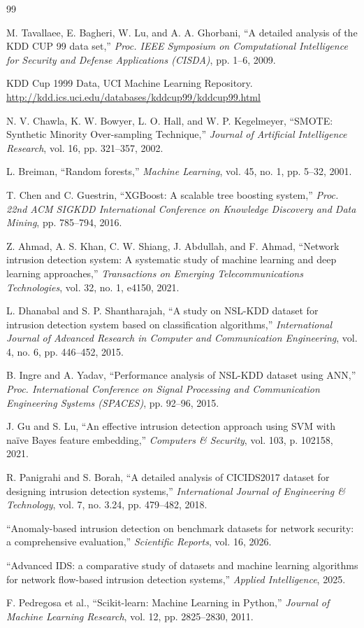\documentclass[11pt, a4paper]{article}
\begin{document}
\begin{thebibliography}{99}

M. Tavallaee, E. Bagheri, W. Lu, and A. A. Ghorbani, ``A detailed analysis of the KDD CUP 99 data set,'' \emph{Proc. IEEE Symposium on Computational Intelligence for Security and Defense Applications (CISDA)}, pp. 1--6, 2009.

KDD Cup 1999 Data, UCI Machine Learning Repository. \url{http://kdd.ics.uci.edu/databases/kddcup99/kddcup99.html}

N. V. Chawla, K. W. Bowyer, L. O. Hall, and W. P. Kegelmeyer, ``SMOTE: Synthetic Minority Over-sampling Technique,'' \emph{Journal of Artificial Intelligence Research}, vol. 16, pp. 321--357, 2002.

L. Breiman, ``Random forests,'' \emph{Machine Learning}, vol. 45, no. 1, pp. 5--32, 2001.

T. Chen and C. Guestrin, ``XGBoost: A scalable tree boosting system,'' \emph{Proc. 22nd ACM SIGKDD International Conference on Knowledge Discovery and Data Mining}, pp. 785--794, 2016.

Z. Ahmad, A. S. Khan, C. W. Shiang, J. Abdullah, and F. Ahmad, ``Network intrusion detection system: A systematic study of machine learning and deep learning approaches,'' \emph{Transactions on Emerging Telecommunications Technologies}, vol. 32, no. 1, e4150, 2021.

L. Dhanabal and S. P. Shantharajah, ``A study on NSL-KDD dataset for intrusion detection system based on classification algorithms,'' \emph{International Journal of Advanced Research in Computer and Communication Engineering}, vol. 4, no. 6, pp. 446--452, 2015.

B. Ingre and A. Yadav, ``Performance analysis of NSL-KDD dataset using ANN,'' \emph{Proc. International Conference on Signal Processing and Communication Engineering Systems (SPACES)}, pp. 92--96, 2015.

J. Gu and S. Lu, ``An effective intrusion detection approach using SVM with na\"ive Bayes feature embedding,'' \emph{Computers \& Security}, vol. 103, p. 102158, 2021.

R. Panigrahi and S. Borah, ``A detailed analysis of CICIDS2017 dataset for designing intrusion detection systems,'' \emph{International Journal of Engineering \& Technology}, vol. 7, no. 3.24, pp. 479--482, 2018.

``Anomaly-based intrusion detection on benchmark datasets for network security: a comprehensive evaluation,'' \emph{Scientific Reports}, vol. 16, 2026.

``Advanced IDS: a comparative study of datasets and machine learning algorithms for network flow-based intrusion detection systems,'' \emph{Applied Intelligence}, 2025.

F. Pedregosa et al., ``Scikit-learn: Machine Learning in Python,'' \emph{Journal of Machine Learning Research}, vol. 12, pp. 2825--2830, 2011.

\end{thebibliography}
\end{document}
